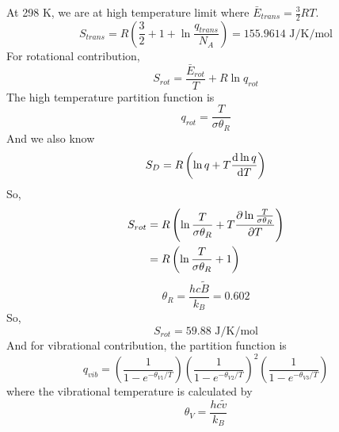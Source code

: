 \begin{solution}
\begin{enumerate}
              At 298 K, we are at high temperature limit where $\bar{E}_{trans}=\frac{3}{2}RT$.
              \begin{equation*}
                  S_{trans}=R(\frac{3}{2}+1+\ln\frac{q_{trans}}{N_A})=155.9614\text{ J/K/mol}
              \end{equation*}
              For rotational contribution,
              \begin{equation*}
                  S_{rot}=\frac{\bar{E}_{rot}}{T}+R\ln q_{rot}
              \end{equation*}
              The high temperature partition function is
              \begin{equation*}
                  q_{rot}=\frac{T}{\sigma\theta_R}
              \end{equation*}
              And we also know
              \begin{equation*}
                  S_D=R\left(\ln q + T\frac{\mathrm{d}\ln q}{\mathrm{d} T}\right)
              \end{equation*}
              So,
              \begin{equation*}
                  \begin{aligned}
                      S_{rot} & =R\left(\ln\frac{T}{\sigma\theta_R}+T\frac{\partial \ln\frac{T}{\sigma\theta_R}}{\partial T}\right) \\
                              & =R\left(\ln\frac{T}{\sigma\theta_R}+1\right)
                  \end{aligned}
              \end{equation*}
              \begin{equation*}
                  \theta_R=\frac{hc\tilde{B}}{k_B}=0.602
              \end{equation*}
              So,
              \begin{equation*}
                  S_{rot}=59.88\text{ J/K/mol}
              \end{equation*}
              And for vibrational contribution, the partition function is
              \begin{equation*}
                  q_{vib}=\left(\frac{1}{1-e^{-\theta_{V1}/T}}\right)\left(\frac{1}{1-e^{-\theta_{V2}/T}}\right)^2
                  \left(\frac{1}{1-e^{-\theta_{V3}/T}}\right)
              \end{equation*}
              where the vibrational temperature is calculated by
              \begin{equation*}
                  \theta_V=\frac{hc\tilde{v}}{k_B}

\end{equation*}
\end{enumerate}
\end{solution}
